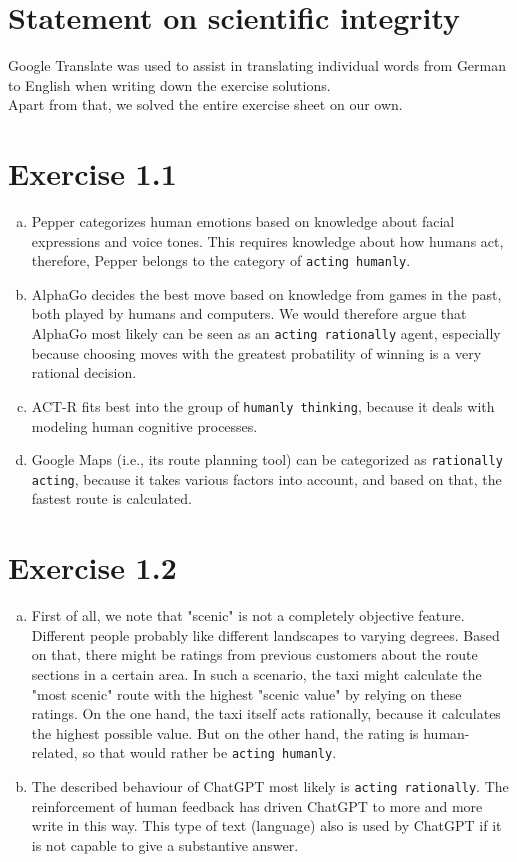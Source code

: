 \documentclass{article} %
\begin{document}
\section*{Statement on scientific integrity}
Google Translate was used to assist in translating individual words from
German to English when writing down the exercise solutions.\\
Apart from that, we solved the entire exercise sheet on our own. 

\section*{Exercise 1.1}

\begin{enumerate}[(a)]
    \item Pepper categorizes human emotions based on knowledge about facial
    expressions and voice tones. This requires knowledge about how humans act,
    therefore, Pepper belongs to the category of \texttt{acting humanly}.
    \item AlphaGo decides the best move based on knowledge from games in the past,
    both played by humans and computers. We would therefore argue that AlphaGo most
    likely can be seen as an \texttt{acting rationally} agent, especially because choosing
    moves with the greatest probatility of winning is a very rational decision.
    \item ACT-R fits best into the group of \texttt{humanly thinking}, because it deals with
    modeling human cognitive processes.
    \item Google Maps (i.e., its route planning tool) can be categorized as
    \texttt{rationally acting}, because it takes various factors into account, and
    based on that, the fastest route is calculated.
\end{enumerate}


\section*{Exercise 1.2}

\begin{enumerate}[(a)]
    \item First of all, we note that "scenic" is not a completely objective feature.
    Different people probably like different landscapes to varying degrees.
    Based on that, there might be ratings from previous customers about the route
    sections in a certain area. In such a scenario, the taxi might calculate the "most
    scenic" route with the highest "scenic value" by relying on these ratings.
    On the one hand, the taxi itself acts rationally, because it calculates the highest
    possible value. But on the other hand, the rating is human-related, so that would
    rather be \texttt{acting humanly}.
    \item The described behaviour of ChatGPT most likely is \texttt{acting rationally}.
    The reinforcement of human feedback has driven ChatGPT to more and more write in
    this way. This type of text (language) also is used by ChatGPT if it is not
    capable to give a substantive answer.
\end{enumerate}
\end{document}
